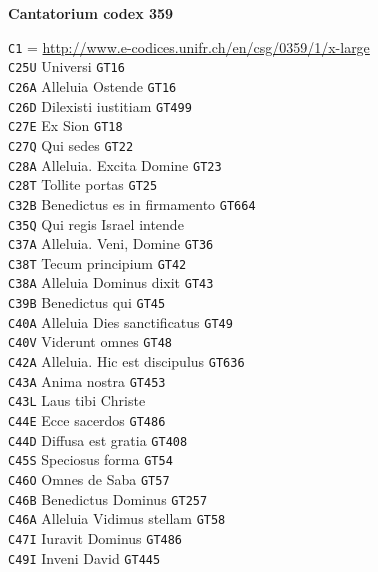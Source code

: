 \documentclass[a4paper]{article}
\begin{document}
{\footnotesize

\begin{multicols}{2}

\noindent\textbf{Cantatorium codex 359}

\noindent
\texttt{C1} = \url{http://www.e-codices.unifr.ch/en/csg/0359/1/x-large}\\
\texttt{C25U} Universi \texttt{GT16}\\
\texttt{C26A} Alleluia Ostende \texttt{GT16}\\
\texttt{C26D} Dilexisti iustitiam \texttt{GT499}\\
\texttt{C27E} Ex Sion \texttt{GT18}\\
\texttt{C27Q} Qui sedes \texttt{GT22}\\
\texttt{C28A} Alleluia. Excita Domine \texttt{GT23}\\
\texttt{C28T} Tollite portas \texttt{GT25}\\
\texttt{C32B} Benedictus es in firmamento \texttt{GT664}\\
\texttt{C35Q} Qui regis Israel intende\\
\texttt{C37A} Alleluia. Veni, Domine \texttt{GT36}\\
\texttt{C38T} Tecum principium \texttt{GT42}\\
\texttt{C38A} Alleluia Dominus dixit \texttt{GT43}\\
\texttt{C39B} Benedictus qui \texttt{GT45}\\
\texttt{C40A} Alleluia Dies sanctificatus \texttt{GT49}\\
\texttt{C40V} Viderunt omnes \texttt{GT48}\\
\texttt{C42A} Alleluia. Hic est discipulus \texttt{GT636}\\
\texttt{C43A} Anima nostra \texttt{GT453}\\
\texttt{C43L} Laus tibi Christe\\
\texttt{C44E} Ecce sacerdos \texttt{GT486}\\
\texttt{C44D} Diffusa est gratia \texttt{GT408}\\
\texttt{C45S} Speciosus forma \texttt{GT54}\\
\texttt{C46O} Omnes de Saba \texttt{GT57}\\
\texttt{C46B} Benedictus Dominus \texttt{GT257}\\
\texttt{C46A} Alleluia Vidimus stellam \texttt{GT58}\\
\texttt{C47I} Iuravit Dominus \texttt{GT486}\\
\texttt{C49I} Inveni David \texttt{GT445}\\

\end{multicols}}
\end{document}
